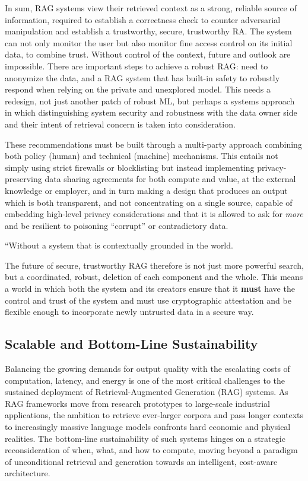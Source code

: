 \documentclass[11pt]{article}
\begin{document}
In sum, RAG systems view their retrieved context as a strong, reliable source of information, required to establish a correctness check to counter adversarial manipulation and establish a trustworthy, secure, trustworthy RA. The system can not only monitor the user but also monitor fine access control on its initial data, to combine trust. Without control of the context, future and outlook are impossible. There are important steps to achieve a robust RAG: need to anonymize the data, and a RAG system that has built-in safety to robustly respond when relying on the private and unexplored model. This needs a redesign, not just another patch of robust ML, but perhaps a systems approach in which distinguishing system security and robustness with the data owner side and their intent of retrieval concern is taken into consideration.

These recommendations must be built through a multi-party approach combining both policy (human) and technical (machine) mechanisms. This entails not simply using strict firewalls or blocklisting but instead implementing privacy-preserving data sharing agreements for both compute and value, at the external knowledge or employer, and in turn making a design that produces an output which is both transparent, and not concentrating on a single source, capable of embedding high-level privacy considerations and that it is allowed to ask for \emph{more} and be resilient to poisoning ``corrupt'' or contradictory data.

``Without a system that is contextually grounded in the world.

The future of secure, trustworthy RAG therefore is not just more powerful search, but a coordinated, robust, deletion of each component and the whole. This means a world in which both the system and its creators ensure that it \textbf{must} have the control and trust of the system and must use cryptographic attestation and be flexible enough to incorporate newly untrusted data in a secure way.

\subsection{Scalable and Bottom-Line Sustainability}

Balancing the growing demands for output quality with the escalating costs of computation, latency, and energy is one of the most critical challenges to the sustained deployment of Retrieval-Augmented Generation (RAG) systems. As RAG frameworks move from research prototypes to large-scale industrial applications, the ambition to retrieve ever-larger corpora and pass longer contexts to increasingly massive language models confronts hard economic and physical realities. The bottom-line sustainability of such systems hinges on a strategic reconsideration of when, what, and how to compute, moving beyond a paradigm of unconditional retrieval and generation towards an intelligent, cost-aware architecture.
\end{document}

